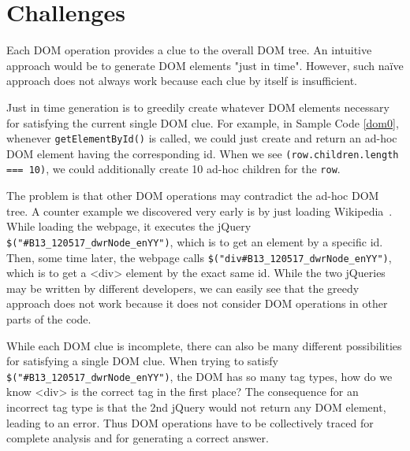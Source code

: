\section{Challenges}

Each DOM operation provides a clue to the overall DOM tree.  An intuitive approach would be to generate DOM elements "just in time".  
However, such naïve approach does not always work because each clue by itself is insufficient.  

Just in time generation is to greedily create whatever DOM elements necessary for satisfying the current single DOM clue.  
For example, in Sample Code \ref{dom0}, whenever {\tt getElementById()} is called, we could just create and return an ad-hoc DOM element having the corresponding id.  
When we see {\tt (row.children.length === 10)}, we could additionally create 10 ad-hoc children for the {\tt row}.  

The problem is that other DOM operations may contradict the ad-hoc DOM tree.  
A counter example we discovered very early is by just loading Wikipedia~\cite{wikipedia}.  
While loading the webpage, it executes the jQuery {\tt \$("\#B13\_120517\_dwrNode\_enYY")}, which is to get an element by a specific id.  
Then, some time later, the webpage calls {\tt \$("div\#B13\_120517\_dwrNode\_enYY")}, which is to get a <div> element by the exact same id.  
While the two jQueries may be written by different developers, we can easily see that the greedy approach does not work because it does not consider DOM operations in other parts of the code.  

While each DOM clue is incomplete, there can also be many different possibilities for satisfying a single DOM clue.  
When trying to satisfy {\tt \$("\#B13\_120517\_dwrNode\_enYY")}, the DOM has so many tag types, how do we know <div> is the correct tag in the first place?  
The consequence for an incorrect tag type is that the 2nd jQuery would not return any DOM element, leading to an error.  
Thus DOM operations have to be collectively traced for complete analysis and for generating a correct answer.  


